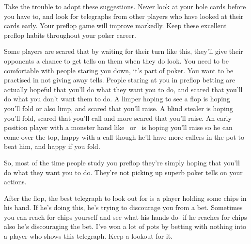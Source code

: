 Take the trouble to adopt these suggestions. Never look at your hole
cards before you have to, and look for telegraphs from other players
who have looked at their cards early. Your preflop game will
improve markedly. Keep these excellent preflop habits
throughout your poker career.

Some players are scared that by waiting for their turn like this,
they'll give their opponents a chance to get tells on them when
they do look. You need to be comfortable with
people staring you down, it's part of poker. You want to be
practised in not giving away tells. People staring at you in
preflop betting are actually hopeful that you'll do what they
want you to do, and scared that you'll do what you don't want them
to do. A limper hoping to see a flop is hoping you'll fold or also limp,
and scared that you'll raise. A blind stealer is hoping you'll fold,
scared that you'll call and more scared that you'll raise. An early
position player with a monster hand like \Kc\Ks\ or \Ad\Kd\ is hoping
you'll raise so he can come over the top, happy with a call though he'll
have more callers in the pot to beat him, and happy if you fold.

So, most of the time people study you preflop they're simply
hoping that you'll do what they want you to do. They're not picking up
superb poker tells on your actions.

After the flop, the best telegraph to look out for is a player
holding some chips in his hand. If he's doing this, he's trying
to discourage you from a bet. Sometimes you can reach for chips
yourself and see what his hands do- if he reaches for chips also
he's discouraging the bet. I've won a lot of pots by betting
with nothing into a player who shows this telegraph. Keep a
lookout for it.

